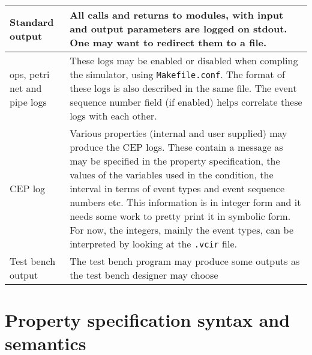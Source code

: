 \documentclass[12pt,a4paper]{article}
\begin{document}
\begin{tabular}{p{.2\linewidth}p{.8\linewidth}}

Standard output &
All calls and returns to modules, with input and output parameters are logged on stdout. One may want to redirect them to a file. \\\hline

ops, petri net and pipe logs &
These logs may be enabled or disabled when compling the simulator, using \texttt{Makefile.conf}. The format of these logs is also described in the same file. The event sequence number field (if enabled) helps correlate these logs with each other. \\\hline

CEP log &
Various properties (internal and user supplied) may produce the CEP logs. These contain a message as may be specified in the property specification, the values of the variables used in the condition, the interval in terms of event types and event sequence numbers etc. This information is in integer form and it needs some work to pretty print it in symbolic form. For now, the integers, mainly the event types, can be interpreted by looking at the \texttt{.vcir} file.
\\\hline

Test bench output &
The test bench program may produce some outputs as the test bench designer may choose \\

\end{tabular}

\clearpage
\section{Property specification syntax and semantics}\label{Sec:Props}
\end{document}
